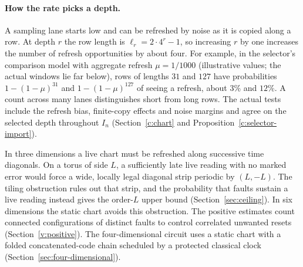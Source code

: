 \paragraph{How the rate picks a depth.}
A sampling lane starts low and can be refreshed by noise as it is copied along a row. At depth \(r\) the row length is \(\ell_r=2\cdot4^r-1\), so increasing \(r\) by one increases the number of refresh opportunities by about four. For example, in the selector's comparison model with aggregate refresh \(\mu=1/1000\) (illustrative values; the actual windows lie far below), rows of lengths \(31\) and \(127\) have probabilities \(1-(1-\mu)^{31}\) and \(1-(1-\mu)^{127}\) of seeing a refresh, about \(3\%\) and \(12\%\). A count across many lanes distinguishes short from long rows. The actual tests include the refresh bias, finite-copy effects and noise margins and agree on the selected depth throughout \(I_n\) (Section~\ref{c:chart} and Proposition~\ref{c:selector-import}).

In three dimensions a live chart must be refreshed along successive time diagonals. On a torus of side \(L\), a sufficiently late live reading with no marked error would force a wide, locally legal diagonal strip periodic by \((L,-L)\). The tiling obstruction rules out that strip, and the probability that faults sustain a live reading instead gives the order-\(L\) upper bound (Section~\ref{sec:ceiling}). In six dimensions the static chart avoids this obstruction. The positive estimates count connected configurations of distinct faults to control correlated unwanted resets (Section~\ref{v:positive}). The four-dimensional circuit uses a static chart with a folded concatenated-code chain scheduled by a protected classical clock (Section~\ref{sec:four-dimensional}).

